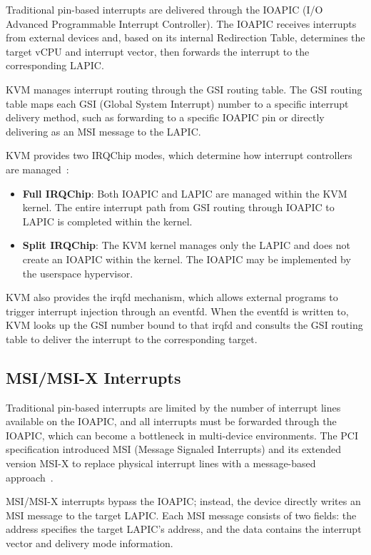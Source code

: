 \begin{ZhChapter}
Traditional pin-based interrupts are delivered through the IOAPIC (I/O Advanced Programmable Interrupt Controller). The IOAPIC receives interrupts from external devices and, based on its internal Redirection Table, determines the target vCPU and interrupt vector, then forwards the interrupt to the corresponding LAPIC.

KVM manages interrupt routing through the GSI routing table. The GSI routing table maps each GSI (Global System Interrupt) number to a specific interrupt delivery method, such as forwarding to a specific IOAPIC pin or directly delivering as an MSI message to the LAPIC.

KVM provides two IRQChip modes, which determine how interrupt controllers are managed~\cite{KVMAPI}:

\begin{itemize}
    \item \textbf{Full IRQChip}: Both IOAPIC and LAPIC are managed within the KVM kernel. The entire interrupt path from GSI routing through IOAPIC to LAPIC is completed within the kernel.
    \item \textbf{Split IRQChip}: The KVM kernel manages only the LAPIC and does not create an IOAPIC within the kernel. The IOAPIC may be implemented by the userspace hypervisor.
\end{itemize}

KVM also provides the irqfd mechanism, which allows external programs to trigger interrupt injection through an eventfd. When the eventfd is written to, KVM looks up the GSI number bound to that irqfd and consults the GSI routing table to deliver the interrupt to the corresponding target.

\subsection{MSI/MSI-X Interrupts}
\label{sec:msi-x}

Traditional pin-based interrupts are limited by the number of interrupt lines available on the IOAPIC, and all interrupts must be forwarded through the IOAPIC, which can become a bottleneck in multi-device environments. The PCI specification introduced MSI (Message Signaled Interrupts) and its extended version MSI-X to replace physical interrupt lines with a message-based approach~\cite{PCI30}.

MSI/MSI-X interrupts bypass the IOAPIC; instead, the device directly writes an MSI message to the target LAPIC. Each MSI message consists of two fields: the address specifies the target LAPIC's address, and the data contains the interrupt vector and delivery mode information.


\end{ZhChapter}
